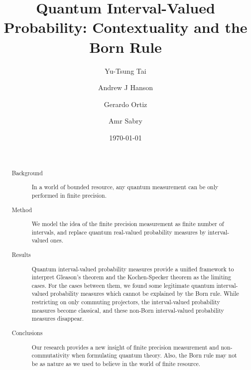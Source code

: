 \documentclass[english,reprint, aps, prl,superscriptaddress, showpacs,
showkeys, longbibliography, amsmath, amssymb]{revtex4-1}
\theoremstyle{plain}
\theoremstyle{definition}
\begin{document}
\title{Quantum Interval-Valued Probability: Contextuality and the Born Rule}

\author{Yu-Tsung Tai}

\author{Andrew J Hanson}

\author{Gerardo Ortiz}

\author{Amr Sabry}

\date{\today}

\begin{abstract}~
\begin{description}
\item [{Background}] In a world of bounded resource, any quantum measurement
can be only performed in finite precision.
\item [{Method}] We model the idea of the finite precision measurement
as finite number of intervals, and replace quantum real-valued probability
measures by interval-valued ones.
\item [{Results}] Quantum interval-valued probability measures provide
a unified framework to interpret Gleason's theorem and the Kochen-Specker
theorem as the limiting cases. For the cases between them, we found
some legitimate quantum interval-valued probability measures which
cannot be explained by the Born rule. While restricting on only commuting
projectors, the interval-valued probability measures become classical,
and these non-Born interval-valued probability measures disappear.
\item [{Conclusions}] Our research provides a new insight of finite precision
measurement and non-commutativity when formulating quantum theory.
Also, the Born rule may not be as nature as we used to believe in
the world of finite resource.


\end{description}
\end{abstract}


\end{document}
